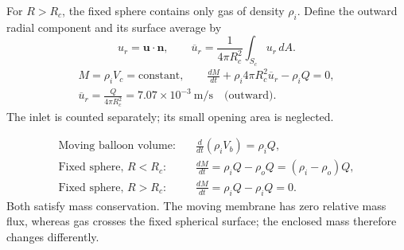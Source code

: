 For $R>R_c$, the fixed sphere contains only gas of density $\rho_i$.
Define the outward radial component and its surface average by
\[
u_r=\mathbf u\cdot\mathbf n,\qquad
\overline u_r=\frac{1}{4\pi R_c^2}\int_{S_c}u_r\,dA.
\]
\begin{gather*}
M=\rho_iV_c=\text{constant},\qquad
\frac{dM}{dt}+\rho_i4\pi R_c^2\overline u_r-\rho_iQ=0,\\
\boxed{\overline u_r=\frac{Q}{4\pi R_c^2}
=7.07\times10^{-3}\ \mathrm{m/s}\quad\text{(outward)}.}
\end{gather*}
The inlet is counted separately; its small opening area is neglected.

\[
\begin{aligned}
\text{Moving balloon volume:}\quad
&\frac{d}{dt}(\rho_iV_b)=\rho_iQ,\\
\text{Fixed sphere, }R<R_c:\quad
&\frac{dM}{dt}=\rho_iQ-\rho_oQ=(\rho_i-\rho_o)Q,\\
\text{Fixed sphere, }R>R_c:\quad
&\frac{dM}{dt}=\rho_iQ-\rho_iQ=0.
\end{aligned}
\]
Both satisfy mass conservation. The moving membrane has zero relative mass
flux, whereas gas crosses the fixed spherical surface; the enclosed mass
therefore changes differently.
